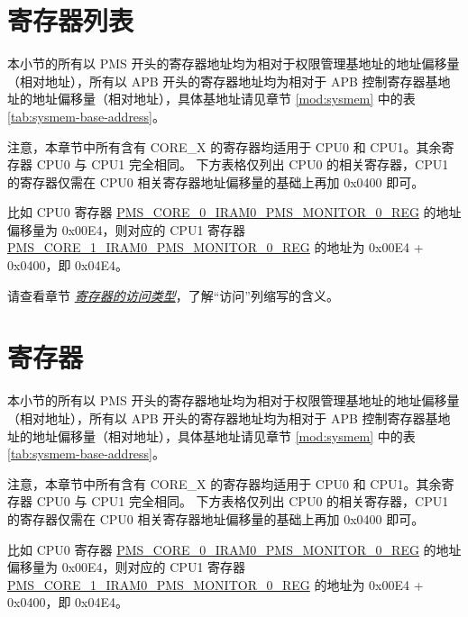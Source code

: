 \documentclass[main\_\_CN.tex]{subfiles}
\begin{document}
\begin{landscape}
\hypertarget{permctrl-reg-summ}{}
\section{寄存器列表}
\label{sec:permctrl-reg-summ}

本小节的所有以 PMS 开头的寄存器地址均为相对于权限管理基地址的地址偏移量（相对地址），所有以 APB 开头的寄存器地址均为相对于 APB 控制寄存器基地址的地址偏移量（相对地址），具体基地址请见章节 \ref{mod:sysmem} \textit{} 中的表 \ref{tab:sysmem-base-address}。

注意，本章节中所有含有 CORE\_X 的寄存器均适用于 CPU0 和 CPU1。其余寄存器 CPU0 与 CPU1 完全相同。
下方表格仅列出 CPU0 的相关寄存器，CPU1 的寄存器仅需在 CPU0 相关寄存器地址偏移量的基础上再加 0x{}0400 即可。

比如 CPU0 寄存器 \hyperref[regdesc:PMSCORE0IRAM0PMSMONITOR0REG]{PMS\_CORE\_0\_IRAM0\_PMS\_MONITOR\_0\_REG} 的地址偏移量为 0x{}00E4，则对应的 CPU1 寄存器 \hyperref[regdesc:PMSCORE0IRAM0PMSMONITOR0REG]{PMS\_CORE\_1\_IRAM0\_PMS\_MONITOR\_0\_REG} 的地址为 0x{}00E4 + 0x{}0400，即 0x{}04E4。

请查看章节 \hyperref[glossary-access-types]{\textit{寄存器的访问类型}}，了解“访问”列缩写的含义。





\clearpage
\section{寄存器}

本小节的所有以 PMS 开头的寄存器地址均为相对于权限管理基地址的地址偏移量（相对地址），所有以 APB 开头的寄存器地址均为相对于 APB 控制寄存器基地址的地址偏移量（相对地址），具体基地址请见章节 \ref{mod:sysmem} \textit{} 中的表 \ref{tab:sysmem-base-address}。

注意，本章节中所有含有 CORE\_X 的寄存器均适用于 CPU0 和 CPU1。其余寄存器 CPU0 与 CPU1 完全相同。
下方表格仅列出 CPU0 的相关寄存器，CPU1 的寄存器仅需在 CPU0 相关寄存器地址偏移量的基础上再加 0x{}0400 即可。

比如 CPU0 寄存器 \hyperref[regdesc:PMSCORE0IRAM0PMSMONITOR0REG]{PMS\_CORE\_0\_IRAM0\_PMS\_MONITOR\_0\_REG} 的地址偏移量为 0x{}00E4，则对应的 CPU1 寄存器 \hyperref[regdesc:PMSCORE0IRAM0PMSMONITOR0REG]{PMS\_CORE\_1\_IRAM0\_PMS\_MONITOR\_0\_REG} 的地址为 0x{}00E4 + 0x{}0400，即 0x{}04E4。




\end{landscape}
\end{document}
